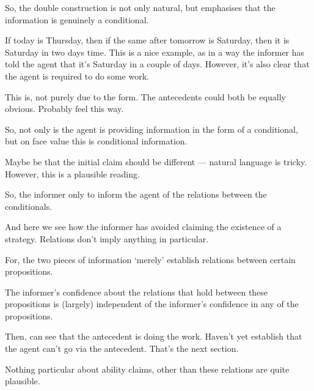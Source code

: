 \documentclass[10pt]{article}
\begin{document}
So, the double construction is not only natural, but emphasises that the information is genuinely a conditional.

If today is Thursday, then if the same after tomorrow is Saturday, then it is Saturday in two days time.
This is a nice example, as in a way the informer has told the agent that it's Saturday in a couple of days.
However, it's also clear that the agent is required to do some work.

This is, not purely due to the form.
The antecedents could both be equally obvious.
Probably feel this way.



So, not only is the agent is providing information in the form of a conditional, but on face value this is conditional information.

Maybe be that the initial claim should be different --- natural language is tricky.
However, this is a plausible reading.

So, the informer only to inform the agent of the relations between the conditionals.

And here we see how the informer has avoided claiming the existence of a strategy.
Relations don't imply anything in particular.

For, the two pieces of information `merely' establish relations between certain propositions.


The informer's confidence about the relations that hold between these propositions is (largely) independent of the informer's confidence in any of the propositions.


Then, can see that the antecedent is doing the work.
Haven't yet establish that the agent can't go via the antecedent.
That's the next section.


Nothing particular about ability claims, other than these relations are quite plausible.
\end{document}
